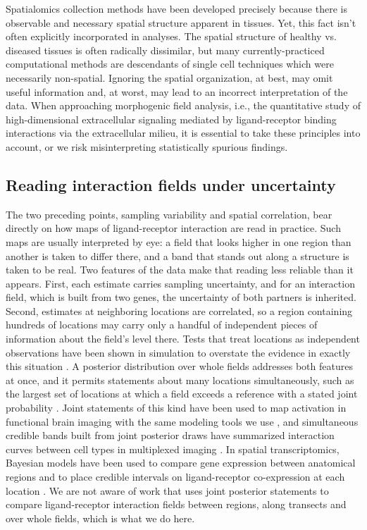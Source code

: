 \documentclass[10pt,letterpaper]{article}
\begin{document}
Spatialomics collection methods have been developed precisely because there is observable and necessary spatial structure apparent in tissues. Yet, this fact isn't often explicitly incorporated in analyses. The spatial structure of healthy vs. diseased tissues is often radically dissimilar, but many currently-practiced computational methods are descendants of single cell techniques which were necessarily non-spatial. Ignoring the spatial organization, at best, may omit useful information and, at worst, may lead to an incorrect interpretation of the data. When approaching morphogenic field analysis, i.e., the quantitative study of high-dimensional extracellular signaling mediated by ligand-receptor binding interactions via the extracellular milieu, it is essential to take these principles into account, or we risk misinterpreting statistically spurious findings.

\subsection*{Reading interaction fields under uncertainty}

The two preceding points, sampling variability and spatial correlation, bear directly on how maps of ligand-receptor interaction are read in practice. Such maps are usually interpreted by eye: a field that looks higher in one region than another is taken to differ there, and a band that stands out along a structure is taken to be real. Two features of the data make that reading less reliable than it appears. First, each estimate carries sampling uncertainty, and for an interaction field, which is built from two genes, the uncertainty of both partners is inherited. Second, estimates at neighboring locations are correlated, so a region containing hundreds of locations may carry only a handful of independent pieces of information about the field's level there. Tests that treat locations as independent observations have been shown in simulation to overstate the evidence in exactly this situation \cite{vasconcelos2026smide,seal2026spacebf}. A posterior distribution over whole fields addresses both features at once, and it permits statements about many locations simultaneously, such as the largest set of locations at which a field exceeds a reference with a stated joint probability \cite{bolin2015excursion}. Joint statements of this kind have been used to map activation in functional brain imaging with the same modeling tools we use \cite{mejia2020bayesian}, and simultaneous credible bands built from joint posterior draws have summarized interaction curves between cell types in multiplexed imaging \cite{eliason2026shade}. In spatial transcriptomics, Bayesian models have been used to compare gene expression between anatomical regions \cite{aijo2019splotch} and to place credible intervals on ligand-receptor co-expression at each location \cite{seal2026spacebf}. We are not aware of work that uses joint posterior statements to compare ligand-receptor interaction fields between regions, along transects and over whole fields, which is what we do here.
\end{document}
